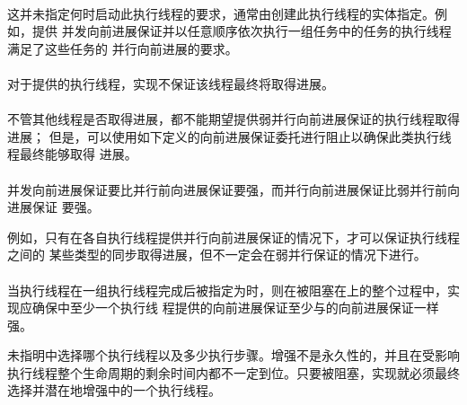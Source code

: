 \paragraph{} %
\begin{note}
  这并未指定何时启动此执行线程的要求，通常由创建此执行线程的实体指定。例如，提供
  并发向前进展保证并以任意顺序依次执行一组任务中的任务的执行线程满足了这些任务的
  并行向前进展的要求。
\end{note}

\paragraph{} %
对于提供的执行线程，实现不保证该线程最终将取得进展。

\paragraph{} %
\begin{note}
  不管其他线程是否取得进展，都不能期望提供弱并行向前进展保证的执行线程取得进展；
  但是，可以使用如下定义的向前进展保证委托进行阻止以确保此类执行线程最终能够取得
  进展。
\end{note}

\paragraph{} %
并发向前进展保证要比并行前向进展保证要强，而并行向前进展保证比弱并行前向进展保证
要强。

\begin{note}
  例如，只有在各自执行线程提供并行向前进展保证的情况下，才可以保证执行线程之间的
  某些类型的同步取得进展，但不一定会在弱并行保证的情况下进行。
\end{note}

\paragraph{} %
当执行线程在一组执行线程完成后被指定为时，则在被阻塞在上的整个过程中，实现应确保中至少一个执行线
程提供的向前进展保证至少与的向前进展保证一样强。

\begin{note}
  未指明中选择哪个执行线程以及多少执行步骤。增强不是永久性的，并且在受影响
  执行线程整个生命周期的剩余时间内都不一定到位。只要被阻塞，实现就必须最终
  选择并潜在地增强中的一个执行线程。
\end{note}

